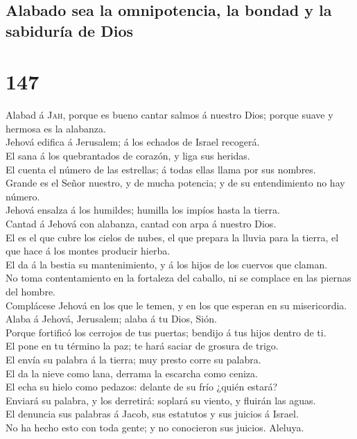\hypertarget{alabado-sea-la-omnipotencia-la-bondad-y-la-sabiduruxeda-de-dios}{%
\subsection{Alabado sea la omnipotencia, la bondad y la sabiduría de
Dios}\label{alabado-sea-la-omnipotencia-la-bondad-y-la-sabiduruxeda-de-dios}}

\hypertarget{section-146}{%
\section{147}\label{section-146}}

 Alabad á \textsc{Jah}, porque es bueno cantar salmos á
nuestro Dios; porque suave y hermosa es la alabanza.\\
 Jehová edifica á Jerusalem; á los echados de Israel
recogerá.\\
 El sana á los quebrantados de corazón, y liga sus
heridas.\\
 El cuenta el número de las estrellas; á todas ellas llama
por sus nombres.\\
 Grande es el Señor nuestro, y de mucha potencia; y de su
entendimiento no hay número.\\
 Jehová ensalza á los humildes; humilla los impíos hasta
la tierra.\\
 Cantad á Jehová con alabanza, cantad con arpa á nuestro
Dios.\\
 El es el que cubre los cielos de nubes, el que prepara la
lluvia para la tierra, el que hace á los montes producir hierba.\\
 El da á la bestia su mantenimiento, y á los hijos de los
cuervos que claman.\\
 No toma contentamiento en la fortaleza del caballo, ni
se complace en las piernas del hombre.\\
 Complácese Jehová en los que le temen, y en los que
esperan en su misericordia.\\
 Alaba á Jehová, Jerusalem; alaba á tu Dios, Sión.\\
 Porque fortificó los cerrojos de tus puertas; bendijo á
tus hijos dentro de ti.\\
 El pone en tu término la paz; te hará saciar de grosura
de trigo.\\
 El envía su palabra á la tierra; muy presto corre su
palabra.\\
 El da la nieve como lana, derrama la escarcha como
ceniza.\\
 El echa su hielo como pedazos: delante de su frío ¿quién
estará?\\
 Enviará su palabra, y los derretirá: soplará su viento,
y fluirán las aguas.\\
 El denuncia sus palabras á Jacob, sus estatutos y sus
juicios á Israel.\\
 No ha hecho esto con toda gente; y no conocieron sus
juicios. Aleluya.

